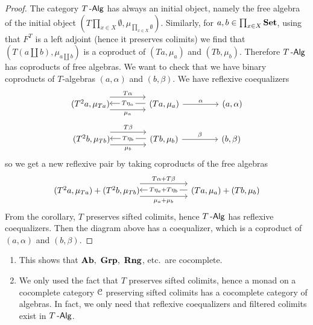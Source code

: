 \documentclass[a4paper,11pt,oneside,openany]{scrbook}
\begin{document}
\begin{proof}
	The category $T\operatorname{-\mathsf{Alg}}$ has always an initial object, namely the free algebra
    of the initial object $\left(T\prod_{x\in X}\emptyset,\mu_{\prod_{x\in
    X}\emptyset}\right)$. Similarly, for $a,b\in\prod_{x\in X}{\normalfont\textbf{Set}}$, using that
    $F^T$ is a left adjoint (hence it preserves colimits) we find that
	$\left(T\left(a\coprod b\right),\mu_{a\coprod b}\right)$ is a coproduct of
	$(Ta,\mu_a)$ and $(Tb,\mu_b)$. Therefore $T\operatorname{-\mathsf{Alg}}$ has coproducts of free
	algebras. We want to check that we have binary coproducts of $T$-algebras
	$(a,\alpha)$ and $(b,\beta)$. We have reflexive coequalizers
	\[
		\begin{tikzcd}[column sep=1.5cm]
			(T^2a,\mu_{Ta})\hspace{-1.5mm}\arrow[r, shift right=1.5ex, "\mu_a"']  \arrow[r, shift left=2ex, "T\alpha"] & (Ta,\mu_a)\arrow[l, shift right=.25ex, "T\eta_a"description]\arrow[r,"\alpha"]&(a,\alpha)
		\end{tikzcd}
	\]
	\[
		\begin{tikzcd}[column sep=1.5cm]
			(T^2b,\mu_{Tb})\hspace{-1.5mm}\arrow[r, shift right=1.5ex, "\mu_b"']  \arrow[r, shift left=2ex, "T\beta"] & (Tb,\mu_b)\arrow[l, shift right=.25ex, "T\eta_b"description]\arrow[r,"\beta"]&(b,\beta)
		\end{tikzcd}
	\]
	so we get a new reflexive pair by taking coproducts of the free algebras
	\[
		\begin{tikzcd}[column sep=2.0cm]
			(T^2a,\mu_{Ta})+(T^2b,\mu_{Tb})\hspace{-1.5mm}\arrow[r, shift right=1.5ex, "\mu_a+\mu_b"']  \arrow[r, shift left=2ex, "T\alpha+T\beta"] & (Ta,\mu_a)+(Tb,\mu_b)\arrow[l, shift right=.25ex, "T\eta_a+T\eta_b" description]
		\end{tikzcd}
	\]
	From the corollary, $T$ preserves sifted colimits, hence $T\operatorname{-\mathsf{Alg}}$ has reflexive coequalizers. Then the diagram above has a coequalizer, which is a coproduct of $(a,\alpha)$ and $(b,\beta)$.
\end{proof}
\begin{rmk}
	\begin{enumerate}
		\item This shows that $\Ab,\ \mathbf{Grp},\ \mathbf{Rng}$, etc.\ are cocomplete.
		\item We only used the fact that $T$ preserves sifted colimits, hence a
		      monad on a cocomplete category $\operatorname{\mathcal{C}}$ preserving sifted colimits has a
		      cocomplete category of algebras. In fact, we only need that
		      reflexive coequalizers and filtered colimits exist in $T\operatorname{-\mathsf{Alg}}$.
	\end{enumerate}
\end{rmk}
\end{document}
